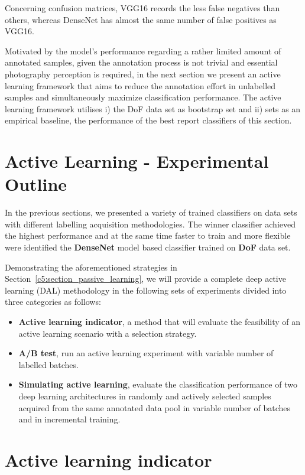 Concerning confusion matrices, VGG16 records the less false negatives than others, whereas DenseNet has almost the same number of false positives as VGG16.

Motivated by the model's performance regarding a rather limited amount of annotated samples, given the annotation process is not trivial and essential photography perception is required, in the next section we present an active learning framework that aims to reduce the annotation effort in unlabelled samples and simultaneously maximize classification performance.
The active learning framework utilises i) the DoF data set as bootstrap set and ii) sets as an empirical baseline, the performance of the best report classifiers of this section.


\section{Active Learning - Experimental Outline}
\label{c5:active_learning}

In the previous sections, we presented a variety of trained classifiers on data sets with different labelling acquisition methodologies. The winner classifier achieved the highest performance and at the same time faster to train and more flexible were identified the \textbf{DenseNet} model based classifier trained on \textbf{DoF} data set.


Demonstrating the aforementioned strategies in Section~\ref{c5:section_passive_learning}, we will provide a complete deep active learning (DAL) methodology in the following sets of experiments divided into three categories as follows:
\begin{itemize}
 \item \textbf{Active learning indicator}, a method that will evaluate the feasibility of an active learning scenario with a selection strategy.
 \item \textbf{A/B test}, run an active learning experiment with variable number of labelled batches.
 \item \textbf{Simulating active learning}, evaluate the classification performance of two deep learning architectures in randomly and actively selected samples acquired from the same annotated data pool in variable number of batches and in incremental training.
\end{itemize}

\section{Active learning indicator}
\label{c5:section_active_learning_indicator}


